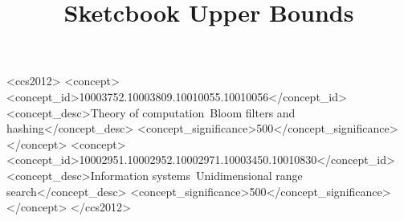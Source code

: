 \documentclass[sigconf]{acmart}
\begin{document}
\title{Sketcbook Upper Bounds}




\begin{abstract}

\end{abstract}

\begin{CCSXML}
<ccs2012>
<concept>
   <concept_id>10003752.10003809.10010055.10010056</concept_id>
   <concept_desc>Theory of computation~Bloom filters and hashing</concept_desc>
   <concept_significance>500</concept_significance>
</concept>
<concept>
   <concept_id>10002951.10002952.10002971.10003450.10010830</concept_id>
   <concept_desc>Information systems~Unidimensional range search</concept_desc>
   <concept_significance>500</concept_significance>
</concept>
</ccs2012>
\end{CCSXML}




\maketitle
\end{document}

